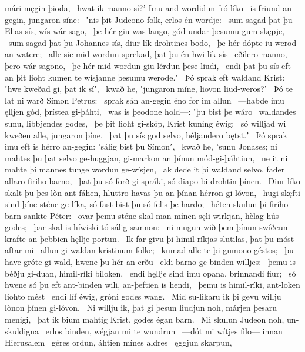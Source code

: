 mári męgin-þioda, \hld\ hwat ik manno sí?ʼ
Imu and-wordidun fró-líko \hld\ is friund an-gegin,
jungaron síne: \hld\ ʽnis þit Judeono folk,
erlos én-wordje: \hld\ sum sagad þat þu Elias sís,
wís wár-sago, \hld\ þe hér giu was lango,
gód undar þesumu gum-skępje, \hld\ sum sagad þat þu Johannes sís,
diur-lík drohtines bodo, \hld\ þe hér dópte iu
werod an watere; \hld\ alle sie mid wordun sprekad,
þat þu én-hwi-lik sís \hld\ eðilero manno,
þero wár-sagono, \hld\ þe hér mid wordun giu
lérdun þese liudi, \hld\ endi þat þu sís eft an þit lioht kumen
te wísjanne þesumu werode.ʼ \hld\ Þó sprak eft waldand Krist:
ʽhwe kweðad gi, þat ik síʼ, \hld\ kwað he, ʽjungaron míne,
liovon liud-weros?ʼ \hld\ Þó te lat ni warð
Símon Petrus: \hld\ sprak sán an-gegin
éno for im allun \hld\ —habde imu ęlljen gód,
þrístea gi-þáhti, \hld\ was is þeodone hold—:
ʽþu bist þe wáro \hld\ waldandes sunu,
libbjendes godes, \hld\ þe þit lioht gi-skóp,
Krist kuning éwig: \hld\ só willjad wi kweðen alle,
jungaron þíne, \hld\ þat þu sís god selvo,
héljandero bętst.ʼ \hld\ Þó sprak imu eft is hérro an-gegin:
ʽsálig bist þu Símonʼ, \hld\ kwað he, ʽsunu Jonases; ni mahtes þu þat selvo ge-huggjan,
gi-markon an þínun mód-gi-þáhtiun, \hld\ ne it ni mahte þi mannes tunge
wordun ge-wísjen, \hld\ ak dede it þi waldand selvo,
fader allaro firiho barno, \hld\ þat þu só forð gi-spráki,
só diapo bi drohtin þínen. \hld\ Diur-líko skalt þu þes lòn ant-fáhen,
hluttro havas þu an þínan hérron gi-lóvon, \hld\ hugi-skęfti sind þíne sténe ge-líka,
só fast bist þu só felis þe hardo; \hld\ héten skulun þi firiho barn
sankte Péter: \hld\ ovar þemu sténe skal man mínen sęli wirkjan,
hèlag hús godes; \hld\ þar skal is híwiski tó
sálig samnon: \hld\ ni mugun wið þem þínun swíðeun krafte
an-þebbien hęllje portun. \hld\ Ik far-givu þi himil-ríkjas slutilas,
þat þu móst aftar mi \hld\ allun gi-waldan
kristinum folke; \hld\ kumad alle te þi
gumono géstos; \hld\ þu have gróte gi-wald,
hwene þu hér an erðu \hld\ eldi-barno
ge-binden willjes: \hld\ þemu is béðju gi-duan,
himil-ríki biloken, \hld\ endi hęllje sind imu opana,
brinnandi fiur; \hld\ só hwene só þu eft ant-binden wili,
an-þeftien is hendi, \hld\ þemu is himil-ríki,
ant-loken liohto mést \hld\ endi líf éwig,
gróni godes wang. \hld\ Mid su-likaru ik þi gevu willju
lònon þínen gi-lóvon. \hld\ Ni willju ik, þat gi þesun liudjun noh,
márjen þesaru menigi, \hld\ þat ik bium mahtig Krist,
godes égan barn. \hld\ Mi skulun Judeon noh,
un-skuldigna \hld\ erlos binden,
wégjan mi te wundrun \hld\ —dót mi wítjes filo—
innan Hierusalem \hld\ géres ordun,
áhtien mínes aldres \hld\ ęggjun skarpun,
